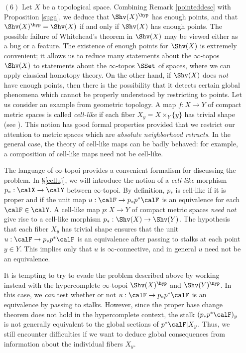 \begin{itemize}
\item[$(6)$] Let $X$ be a topological space. Combining Remark \ref{pointeddesc} with Proposition \ref{suga}, we deduce that $\Shv(X)^{\hyp}$ has enough points, and that $\Shv(X)^{\hyp} = \Shv(X)$ if and only if $\Shv(X)$ has enough points. The possible failure of Whitehead's theorem in $\Shv(X)$ may be viewed either as a bug or a feature. The existence of enough points for $\Shv(X)$ is extremely convenient; it allows us to reduce many statements about the $\infty$-topos $\Shv(X)$
to statements about the $\infty$-topos $\SSet$ of spaces, where we can apply classical homotopy theory. On the other hand, if $\Shv(X)$ does {\em not} have enough points, then there is the possibility that it detects certain global phenomena 
which cannot be properly understood by restricting to points. Let us consider an example from geometric topology. A map $f: X \rightarrow Y$ of compact metric spaces is called {\it cell-like} if each fiber $X_{y} = X \times_{Y} \{y\}$ has trivial shape (see \cite{cellmap}). This notion has good formal properties provided that we restrict our attention to metric spaces which are {\em absolute neighborhood retracts}. In the general case, the theory of cell-like maps can be badly behaved: for example, a composition of cell-like maps need not be cell-like. 

The language of $\infty$-topoi provides a convenient formalism for discussing the problem. 
In \S \ref{celluj}, we will introduce the notion of a {\em cell-like} morphism $p_{\ast}: \calX \rightarrow \calY$ between $\infty$-topoi. By definition, $p_{\ast}$ is cell-like if it is proper and if the unit map $u: \calF \rightarrow p_{\ast} p^{\ast} \calF$ is an equivalence for each $\calF \in \calY$. A cell-like map $p: X \rightarrow Y$ of compact metric spaces {\em need not} give rise to a cell-like morphism $p_{\ast}: \Shv(X) \rightarrow \Shv(Y)$. The hypothesis
that each fiber $X_{y}$ has trivial shape ensures that the unit $u: \calF \rightarrow p_{\ast} p^{\ast} \calF$ is an equivalence after passing to stalks at each point $y \in Y$. This implies only that
$u$ is $\infty$-connective, and in general $u$ need not be an equivalence.

\begin{remark}
It is tempting to try to evade the problem described above by working instead with the hypercomplete $\infty$-topoi $\Shv(X)^{\hyp}$ and $\Shv(Y)^{\hyp}$. In this case, we {\em can} test whether or not $u: \calF \rightarrow p_{\ast} p^{\ast} \calF$ is an equivalence by passing to stalks. However, since the proper base change theorem does not hold in the hypercomplete context, the stalk $(p_{\ast} p^{\ast} \calF)_{y}$ is not generally equivalent to the global sections of
$p^{\ast} \calF | X_{y}$. Thus, we still encounter difficulties if we want to deduce global consequences from information about the individual fibers $X_{y}$. 
\end{remark}


\end{itemize}
